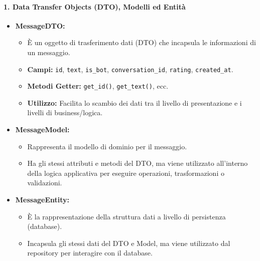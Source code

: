     \paragraph{1. Data Transfer Objects (DTO), Modelli ed Entità}
    \begin{itemize}
        \item \textbf{MessageDTO:}
        \begin{itemize}
            \item È un oggetto di trasferimento dati (DTO) che incapsula le informazioni di un messaggio.
            \item \textbf{Campi:} \texttt{id}, \texttt{text}, \texttt{is\_bot}, \texttt{conversation\_id}, \texttt{rating}, \texttt{created\_at}.
            \item \textbf{Metodi Getter:} \texttt{get\_id()}, \texttt{get\_text()}, ecc.
            \item \textbf{Utilizzo:} Facilita lo scambio dei dati tra il livello di presentazione e i livelli di business/logica.
        \end{itemize}
        \item \textbf{MessageModel:}
        \begin{itemize}
            \item Rappresenta il modello di dominio per il messaggio.
            \item Ha gli stessi attributi e metodi del DTO, ma viene utilizzato all'interno della logica applicativa per eseguire operazioni, trasformazioni o validazioni.
        \end{itemize}
        \item \textbf{MessageEntity:}
        \begin{itemize}
            \item È la rappresentazione della struttura dati a livello di persistenza (database).
            \item Incapsula gli stessi dati del DTO e Model, ma viene utilizzato dal repository per interagire con il database.
        \end{itemize}
    \end{itemize}

